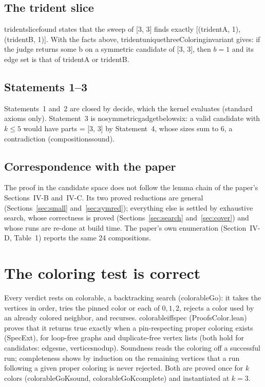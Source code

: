 \documentclass[11pt,a4paper]{article}
\newcommand{\leanus}{\textunderscore\allowbreak}
\newcommand{\lean}[1]{{\ttfamily\let\_\leanus #1}}
\theoremstyle{definition}
\begin{document}
\subsection{The trident slice}\label{sec:slice}
\lean{trident\_slice\_found} states that the sweep of \lean{[3, 3]} finds
exactly \lean{[(tridentA, 1), (tridentB, 1)]}. With the facts above,
\lean{trident\_unique\_threeColoring\_invariant} gives: if the judge returns
\lean{some b} on a symmetric candidate of \lean{[3, 3]}, then $b=1$ and its
edge set is that of \lean{tridentA} or \lean{tridentB}.

\subsection{Statements 1--3}
Statements~1 and~2 are closed by \lean{decide}, which the kernel evaluates
(standard axioms only). Statement~3 is \lean{no\_symmetric\_gadget\_below\_six}:
a valid candidate with $k\le5$ would have \lean{parts = [3, 3]} by Statement~4,
whose sizes sum to $6$, a contradiction (\lean{compositions\_sound}).

\subsection{Correspondence with the paper}
The proof in the candidate space does not follow the lemma chain of the
paper's Sections~IV-B and~IV-C. Its two proved reductions are general (Sections~\ref{sec:small}
and~\ref{sec:symred}); everything else is settled by exhaustive search,
whose correctness is proved (Sections~\ref{sec:search} and~\ref{sec:cover})
and whose runs are re-done at build time. The paper's own enumeration
(Section~IV-D, Table~1) reports the same 24 compositions.

\section{The coloring test is correct}\label{sec:color}
Every verdict rests on \lean{colorable}, a backtracking search
(\lean{colorableGo}): it takes the vertices in order, tries the pinned color
or each of $0,1,2$, rejects a color used by an already colored neighbor, and
recurses. \lean{colorable\_iff\_spec} (\lean{ProofsColor.lean}) proves that it
returns \lean{true} exactly when a pin-respecting proper coloring exists
(\lean{SpecExt}), for loop-free graphs and duplicate-free vertex lists (both
hold for candidates: \lean{edges\_ne}, \lean{vertices\_nodup}). Soundness
reads the coloring off a successful run; completeness shows by induction on
the remaining vertices that a run following a given proper coloring is never
rejected. Both are proved once for $k$ colors (\lean{colorableGoK\_sound},
\lean{colorableGoK\_complete}) and instantiated at $k=3$.
\end{document}
